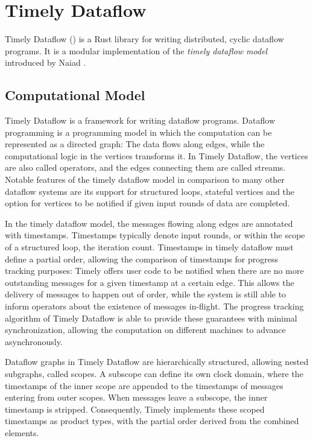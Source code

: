 \chapter{Timely Dataflow}\label{ch:background}

Timely Dataflow \cite{timely} () is a Rust library for writing distributed,
cyclic dataflow programs. It is a modular implementation of the \emph{timely dataflow
model} introduced by Naiad \cite{naiad}. 

\section{Computational Model}

Timely Dataflow is a framework for writing dataflow programs. Dataflow programming
is a programming model in which the computation can be represented as a directed graph:
The data flows along edges, while the computational logic in the vertices transforms it.
In Timely Dataflow, the vertices are also called operators, and the edges connecting
them are called streams. Notable features of the timely dataflow model in comparison
to many other dataflow systems are its support for structured loops, stateful
vertices and the option for vertices to be notified if given input rounds of
data are completed. \cite{naiad}

In the timely dataflow model, the messages flowing along edges are annotated with
timestamps. Timestamps typically denote input rounds, or within the scope of a
structured loop, the iteration count. Timestamps in timely dataflow must
define a partial order, allowing the comparison of timestamps for progress
tracking purposes: Timely offers user code to be notified when there are
no more outstanding messages for a given timestamp at a certain edge.
This allows the delivery of messages to happen out of order, while the system
is still able to inform operators about the existence of messages in-flight.
The progress tracking algorithm of Timely Dataflow is able to provide these
guarantees with minimal synchronization, allowing the computation on different
machines to advance asynchronously.

Dataflow graphs in Timely Dataflow are hierarchically structured, allowing
nested subgraphs, called scopes. A subscope can define its own clock
domain, where the timestamps of the inner scope are appended to the timestamps of messages
entering from outer scopes. When messages leave a subscope, the inner 
timestamp is stripped. Consequently, Timely implements these scoped timestamps
as product types, with the partial order derived from the combined elements.


